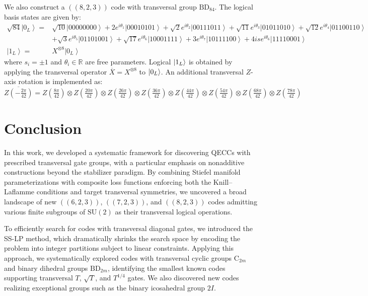 \documentclass[8pt]{article}
\theoremstyle{definition}
\begin{document}
We also construct a \(((8,2,3))\) code with transversal group \(\mathrm{BD}_{84}\). The logical basis states are given by:
\begin{align*}
    \sqrt{84}\left|0_{L}\right\rangle = & \sqrt{10}\left|00000000\right\rangle +2e^{i\theta_{1}}\left|00010101\right\rangle +\sqrt{2}e^{i\theta_{2}}\left|00111011\right\rangle +\sqrt{11}e^{i\theta_{3}}\left|01011010\right\rangle +\sqrt{12}e^{i\theta_{4}}\left|01100110\right\rangle \\
                                        & +\sqrt{3}e^{i\theta_{5}}\left|01101001\right\rangle +\sqrt{17}e^{i\theta_{6}}\left|10001111\right\rangle +3e^{i\theta_{7}}\left|10111100\right\rangle +4ise^{i\theta_{6}}\left|11110001\right\rangle                                            \\
    \left|1_{L}\right\rangle =          & X^{\otimes8}\left|0_{L}\right\rangle
\end{align*}
where \(s_i = \pm 1\) and \(\theta_i \in \mathbb{R}\) are free parameters. Logical \(\ket{1_L}\) is obtained by applying the transversal operator \(\overline{X} = X^{\otimes 8}\) to \(\ket{0_L}\). An additional transversal \(Z\)-axis rotation is implemented as:
\[ \overline{Z\left(-\tfrac{2\pi}{42}\right)}=Z\left(\tfrac{8\pi}{42}\right)\otimes Z\left(\tfrac{20\pi}{42}\right)\otimes Z\left(\tfrac{26\pi}{42}\right)\otimes Z\left(\tfrac{36\pi}{42}\right)\otimes Z\left(\tfrac{44\pi}{42}\right)\otimes Z\left(\tfrac{54\pi}{42}\right)\otimes Z\left(\tfrac{68\pi}{42}\right)\otimes Z\left(\tfrac{78\pi}{42}\right) \]

\section{Conclusion}


In this work, we developed a systematic framework for discovering QECCs with prescribed transversal gate groups, with a particular emphasis on nonadditive constructions beyond the stabilizer paradigm. By combining Stiefel manifold parameterizations with composite loss functions enforcing both the Knill–Laflamme conditions and target transversal symmetries, we uncovered a broad landscape of new $((6,2,3))$, $((7,2,3))$, and $((8,2,3))$ codes admitting various finite subgroups of $\mathrm{SU}(2)$ as their transversal logical operations.

To efficiently search for codes with transversal diagonal gates, we introduced the SS-LP method, which dramatically shrinks the search space by encoding the problem into integer partitions subject to linear constraints. Applying this approach, we systematically explored codes with transversal cyclic groups $\mathrm{C}_{2m}$ and binary dihedral groups $\mathrm{BD}_{2m}$, identifying the smallest known codes supporting transversal $T$, $\sqrt{T}$, and $T^{1/4}$ gates. We also discovered new codes realizing exceptional groups such as the binary icosahedral group $2I$.
\end{document}
